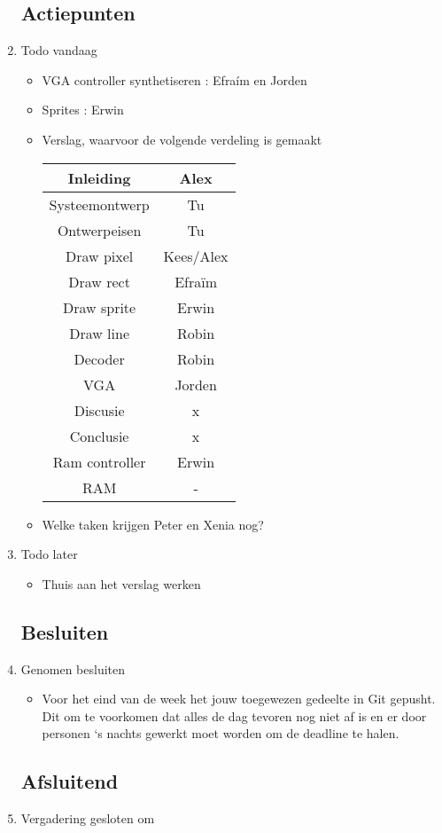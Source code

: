 \documentclass{article}
\begin{document}
\begin{enumerate}
	\subsection*{Actiepunten}
	\item Todo vandaag
	\begin{itemize}
		\item VGA controller synthetiseren : Efraím en Jorden
		\item Sprites : Erwin
		\item Verslag, waarvoor de volgende verdeling is gemaakt \\
		\begin{tabular}{|c|c|}
		\hline 
		Inleiding & Alex \\ 
		\hline 
		Systeemontwerp & Tu\\
		\hline
		Ontwerpeisen & Tu \\ 
		\hline 
		Draw pixel & Kees/Alex \\ 
		\hline 
		Draw rect & Efraïm \\ 
		\hline 
		Draw sprite & Erwin \\ 
		\hline 
		Draw line & Robin \\ 
		\hline 
		Decoder & Robin \\ 
		\hline 
		VGA & Jorden \\ 
		\hline 
		Discusie & x \\ 
		\hline 
		Conclusie & x \\ 
		\hline 
		Ram controller & Erwin \\ 
		\hline 
RAM & - \\ 
\hline 

\end{tabular} 
	\item Welke taken krijgen Peter en Xenia nog?
	\end{itemize}
	\item Todo later
	\begin{itemize}
		\item Thuis aan het verslag werken
	\end{itemize}

	\subsection*{Besluiten}
	\item Genomen besluiten
	\begin{itemize}
		\item Voor het eind van de week het jouw toegewezen gedeelte in Git gepusht. Dit om te voorkomen dat alles de dag tevoren nog niet af is en 
		er door personen `s nachts gewerkt moet worden om de deadline te halen. 
	\end{itemize}

	\noindent 
	\subsection*{Afsluitend}
	\item Vergadering gesloten om %

\end{enumerate}
\end{document}

